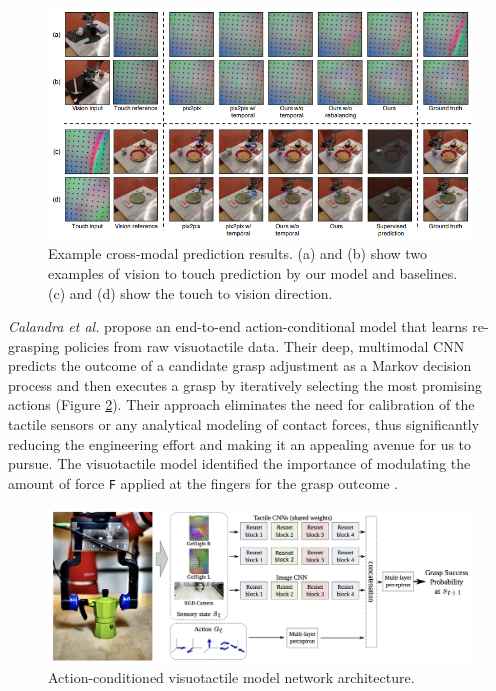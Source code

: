 \documentclass[11.5pt]{article}
\begin{document}
\begin{figure}[H]
    \centering
    \includegraphics[width=0.88\linewidth]{assets/li.png}
    \caption{Example cross-modal prediction results. (a) and (b) show two examples of vision to touch prediction by our model and baselines. (c) and (d) show the touch to vision direction.}
    \label{fig:li}
\end{figure}

\newpage

\textit{Calandra et al.} propose an end-to-end action-conditional model that learns re-grasping policies from raw visuotactile data. Their deep, multimodal CNN predicts the outcome of a candidate grasp adjustment as a Markov decision process and then executes a grasp by iteratively selecting the most promising actions (Figure \ref{fig:calandra}). Their approach eliminates the need for calibration of the tactile sensors or any analytical modeling of contact forces, thus significantly reducing the engineering effort and making it an appealing avenue for us to pursue. The visuotactile model identified the importance of modulating the amount of force \texttt{F} applied at the fingers for the grasp outcome \cite{Calandra2018-zy}. 

\begin{figure}[H]
    \centering
    \includegraphics[width=0.95\linewidth]{assets/calandra.png}
    \caption{Action-conditioned visuotactile model network architecture.}
    \label{fig:calandra}
\end{figure}
\end{document}
